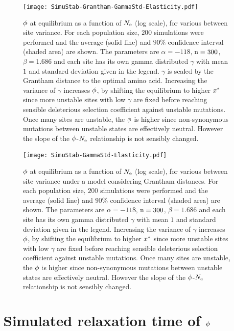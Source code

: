 \begin{figure}[H]
	\centering
	\texttt{[image: SimuStab-Grantham-GammaStd-Elasticity.pdf]}
	\caption[Effect of site variance on the susceptibility]{
	$\phi$ at equilibrium as a function of $N_{\mathrm{e}}$ (log scale), for various between site variance.
	For each population size, $200$ simulations were performed and the average (solid line) and $90\%$ confidence interval (shaded area) are shown.
	The parameters are $\alpha=-118$, $\text{n}=300$, $\beta=1.686$ and each site has its own gamma distributed $\gamma$ with mean $1$ and standard deviation given in the legend. $\gamma$ is scaled by the Grantham distance to the optimal amino acid.
	Increasing the variance of $\gamma$ increases $\phi$, by shifting the equilibrium to higher $x^{*}$ since more unstable sites with low $\gamma$ are fixed before reaching sensible deleterious selection coefficient against unstable mutations. Once many sites are unstable, the $\phi$ is higher since non-synonymous mutations between unstable states are effectively neutral. However the slope of the $\phi$-$N_{\mathrm{e}}$ relationship is not sensibly changed.
	}
\end{figure}

\begin{figure}[H]
	\centering
	\texttt{[image: SimuStab-GammaStd-Elasticity.pdf]}
	\caption[Effect of site variance on the susceptibility without Grantham distance]{
	$\phi$ at equilibrium as a function of $N_{\mathrm{e}}$ (log scale), for various between site variance under a model considering Grantham distances.
	For each population size, $200$ simulations were performed and the average (solid line) and $90\%$ confidence interval (shaded area) are shown.
	The parameters are $\alpha=-118$, $\text{n}=300$, $\beta=1.686$ and each site has its own gamma distributed $\gamma$ with mean $1$ and standard deviation given in the legend.
	Increasing the variance of $\gamma$ increases $\phi$, by shifting the equilibrium to higher $x^{*}$ since more unstable sites with low $\gamma$ are fixed before reaching sensible deleterious selection coefficient against unstable mutations. Once many sites are unstable, the $\phi$ is higher since non-synonymous mutations between unstable states are effectively neutral. However the slope of the $\phi$-$N_{\mathrm{e}}$ relationship is not sensibly changed.
	}
\end{figure}

\section{Simulated relaxation time of \texorpdfstring{$\phi$}{φ}}

